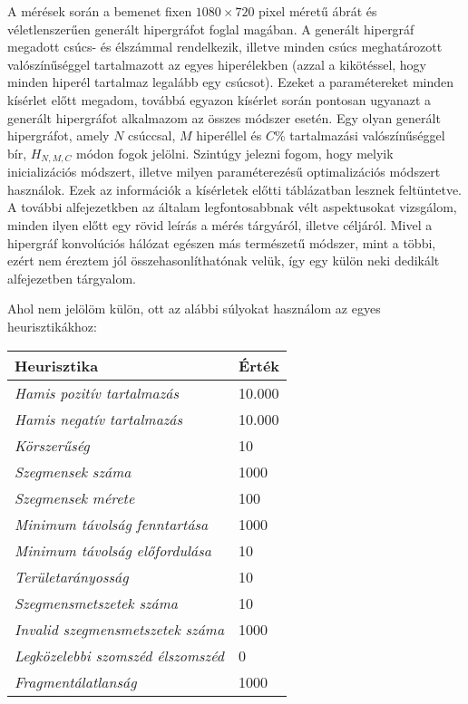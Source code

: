 A mérések során a bemenet fixen $1080 \times 720$ pixel méretű ábrát és véletlenszerűen generált hipergráfot foglal magában. A generált hipergráf megadott csúcs- és élszámmal rendelkezik, illetve minden csúcs meghatározott valószínűséggel tartalmazott az egyes hiperélekben (azzal a kikötéssel, hogy minden hiperél tartalmaz legalább egy csúcsot). Ezeket a paramétereket minden kísérlet előtt megadom, továbbá egyazon kísérlet során pontosan ugyanazt a generált hipergráfot alkalmazom az összes módszer esetén. Egy olyan generált hipergráfot, amely $N$ csúccsal, $M$ hiperéllel és $C\%$ tartalmazási valószínűséggel bír, $H_{N,M,C}$ módon fogok jelölni. Szintúgy jelezni fogom, hogy melyik inicializációs módszert, illetve milyen paraméterezésű optimalizációs módszert használok. Ezek az információk a kísérletek előtti táblázatban lesznek feltüntetve. A további alfejezetkben az általam legfontosabbnak vélt aspektusokat vizsgálom, minden ilyen előtt egy rövid leírás a mérés tárgyáról, illetve céljáról.
Mivel a hipergráf konvolúciós hálózat egészen más természetű módszer, mint a többi, ezért nem éreztem jól összehasonlíthatónak velük, így egy külön neki dedikált alfejezetben tárgyalom.


Ahol nem jelölöm külön, ott az alábbi súlyokat használom az egyes heurisztikákhoz:
\newline

\begin{longtable}{| p{} | p{} |}
		\hline
		\hfil\textbf{Heurisztika} & \hfil\textbf{Érték} \\
		\hline \hline
		\emph{Hamis pozitív tartalmazás} & \hfil10.000 \\
		\hline
		\emph{Hamis negatív tartalmazás} & \hfil10.000 \\
		\hline
		\emph{Körszerűség} & \hfil10 \\
		\hline
		\emph{Szegmensek száma} & \hfil1000 \\
		\hline
		\emph{Szegmensek mérete} & \hfil100 \\
		\hline
		\emph{Minimum távolság fenntartása} & \hfil1000 \\
		\hline
		\emph{Minimum távolság előfordulása} &  \hfil10 \\
		\hline
		\emph{Területarányosság} & \hfil10 \\
		\hline
		\emph{Szegmensmetszetek száma} & \hfil10 \\
		\hline
		\emph{Invalid szegmensmetszetek száma} & \hfil1000 \\
		\hline
		\emph{Legközelebbi szomszéd élszomszéd} & \hfil0 \\
		\hline
		\emph{Fragmentálatlanság} & \hfil1000 \\
		\hline
\end{longtable}

